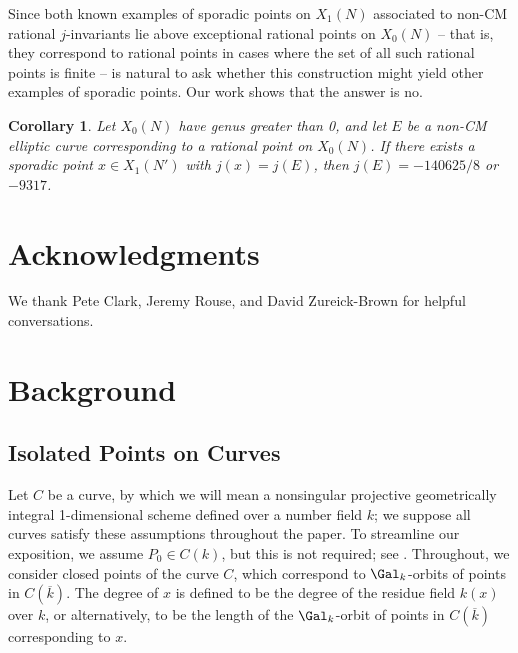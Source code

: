 \documentclass[11pt,reqno]{amsart}
\theoremstyle{plain}
\newtheorem{corollary}[theorem]{Corollary}
\theoremstyle{definition}
\begin{document}
Since both known examples of sporadic points on $X_1(N)$ associated to non-CM rational $j$-invariants lie above exceptional rational points on $X_0(N)$ -- that is, they correspond to rational points in cases where the set of all such rational points is finite -- is natural to ask whether this construction might yield other examples of sporadic points. Our work shows that the answer is no.
\begin{corollary}
Let $X_0(N)$ have genus greater than 0, and let $E$ be a non-CM elliptic curve corresponding to a rational point on $X_0(N)$. If there exists a sporadic point $x \in X_1(N')$ with $j(x)=j(E)$, then $j(E) =-140625/8$ or $-9317$.
\end{corollary}

\section*{Acknowledgments}
We thank Pete Clark, Jeremy Rouse, and David Zureick-Brown for helpful conversations.

\section{Background}
\subsection{Isolated Points on Curves}
Let $C$ be a curve, by which we will mean a nonsingular projective geometrically integral 1-dimensional scheme defined over a number field $k$; we suppose all curves satisfy these assumptions throughout the paper. To streamline our exposition, we assume $P_0 \in C(k)$, but this is not required; see \cite[$\S4$]{BELOV}. Throughout, we consider closed points of the curve $C$, which correspond to $\Gal_k$-orbits of points in $C(\overline{k})$. The degree of $x$ is defined to be the degree of the residue field $k(x)$ over $k$, or alternatively, to be the length of the $\Gal_k$-orbit of points in $C(\overline{k})$ corresponding to $x$.
\end{document}
